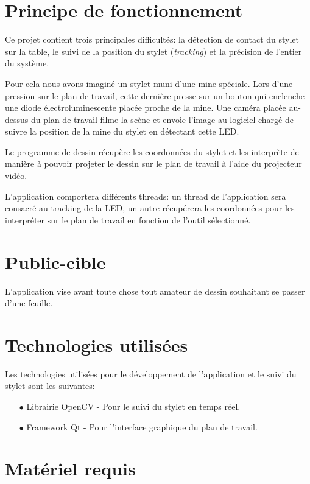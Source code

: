 \documentclass[11pt,a4paper,oldfontcommands]{memoir}
\begin{document}
\newpage

\section{Principe de fonctionnement}

Ce projet contient trois principales difficultés: la détection de contact du stylet sur la table, le suivi de la position du stylet (\textit{tracking}) et la précision de l'entier du système.

Pour cela nous avons imaginé un stylet muni d'une mine spéciale. Lors d'une pression sur le plan de travail, cette dernière presse sur un bouton qui enclenche une diode électroluminescente placée proche de la mine. Une caméra placée au-dessus du plan de travail filme la scène et envoie l'image au logiciel chargé de suivre la position de la mine du stylet en détectant cette LED.

Le programme de dessin récupère les coordonnées du stylet et les interprète de manière à pouvoir projeter le dessin sur le plan de travail à l'aide du projecteur vidéo.

L'application comportera différents threads: un thread de l'application sera consacré au tracking de la LED, un autre récupérera les coordonnées pour les interpréter sur le plan de travail en fonction de l'outil sélectionné.

\section{Public-cible}

L'application vise avant toute chose tout amateur de dessin souhaitant se passer d'une feuille.

\section{Technologies utilisées}

Les technologies utilisées pour le développement de l'application et le suivi du stylet sont les suivantes:

\begin{itemize}
\item[$\bullet$] Librairie OpenCV - Pour le suivi du stylet en temps réel.
\item[$\bullet$] Framework Qt - Pour l'interface graphique du plan de travail.
\end{itemize}

\section{Matériel requis}
\end{document}
